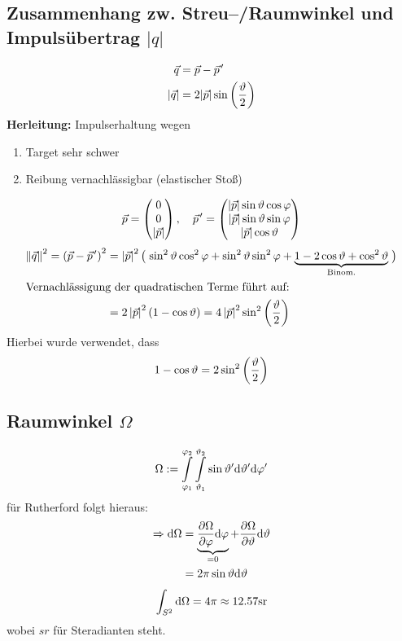 \documentclass[Ex4_Zusammenfassung.tex]{subfiles}
\begin{document}
\subsection*{Zusammenhang zw. Streu--/Raumwinkel und Impulsübertrag $|q|$}
\begin{align}
	\vec{q} &= \vec{p} - \pvec{p}^\prime \\
	|\vec{q}| &= 2 |\vec{p}| \sin \lp \frac{\vartheta}{2} \rp 
\end{align}
\textbf{Herleitung:} Impulserhaltung wegen
\begin{enumerate}
	\item Target sehr schwer
	\item Reibung vernachlässigbar (elastischer Stoß)
\end{enumerate}
\begin{equation}
	\vec{p} = \threevec{0}{0}{|\vec{p}|}, \quad \pvec{p}^\prime = \threevec{|\vec{p}| \sin \vartheta \cos \varphi}{|\vec{p}| \sin \vartheta \sin \varphi}{|\vec{p}| \cos \vartheta}
\end{equation}
\begin{align}
	\left\Vert \vec{q} \right\Vert^2 = \lp \vec{p} - \pvec{p}^\prime \rp^2 &= \left\vert \vec{p} \right\vert^2
	\lp \vphantom{\sin^2 \vartheta \cos^2 \varphi + \sin^2 \vartheta \sin^2 \varphi } \right.
	\sin^2 \vartheta \cos^2 \varphi + \sin^2 \vartheta \sin^2 \varphi + \underbrace{1 - 2\cos \vartheta + \cos^2 \vartheta}_{\text{Binom.}} 
	\left. \vphantom{\sin^2 \vartheta \cos^2 \varphi + \sin^2 \vartheta \sin^2 \varphi} \rp\\
	\intertext{Vernachlässigung der quadratischen Terme führt auf:}
	&= 2 \left\vert \vec{p} \right\vert^2 \lp 1 - \cos \vartheta \rp = 4 \left\vert \vec{p} \right\vert^2 \sin^2 \lp \frac{\vartheta}{2} \rp
\end{align}
Hierbei wurde verwendet, dass
\begin{equation*}
	1 - \cos \vartheta = 2 \sin^2 \lp \frac{\vartheta}{2} \rp
\end{equation*}

\subsection*{Raumwinkel $\Omega$}
\begin{equation}
	\Omega := \mathop{\int}_{\varphi_1}^{\varphi_2} \mathop{\int}_{\vartheta_1}^{\vartheta_2} \sin \vartheta^\prime \md \vartheta^\prime \md \varphi^\prime
\end{equation}
für Rutherford folgt hieraus: 
\begin{align}
	\Rightarrow \md \Omega &= \underbrace{\frac{\partial \Omega}{\partial \varphi} \md \varphi}_{=0} + \frac{\partial \Omega}{\partial \vartheta} \md \vartheta\\
	&= 2 \pi \sin \vartheta \md \vartheta
\end{align}
\begin{equation}
	\int_{S^2} \md \Omega = 4\pi \approx 12.57\si{sr}
\end{equation}
wobei $\si{sr}$ für Steradianten steht.
\end{document}
